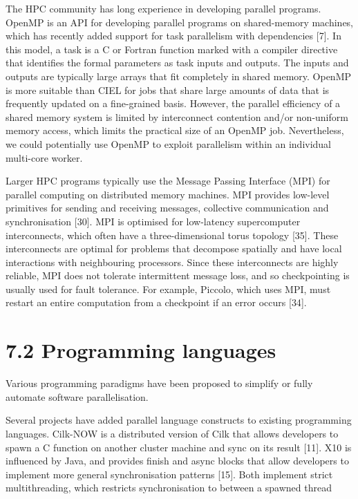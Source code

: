 \documentclass[
]{article}
\begin{document}
The HPC community has long experience in developing parallel programs.
OpenMP is an API for developing parallel programs on shared-memory
machines, which has recently added support for task parallelism with
dependencies {[}7{]}. In this model, a task is a C or Fortran function
marked with a compiler directive that identifies the formal parameters
as task inputs and outputs. The inputs and outputs are typically large
arrays that fit completely in shared memory. OpenMP is more suitable
than CIEL for jobs that share large amounts of data that is frequently
updated on a fine-grained basis. However, the parallel efficiency of a
shared memory system is limited by interconnect contention and/or
non-uniform memory access, which limits the practical size of an OpenMP
job. Nevertheless, we could potentially use OpenMP to exploit
parallelism within an individual multi-core worker.

Larger HPC programs typically use the Message Passing Interface (MPI)
for parallel computing on distributed memory machines. MPI provides
low-level primitives for sending and receiving messages, collective
communication and synchronisation {[}30{]}. MPI is optimised for
low-latency supercomputer interconnects, which often have a
three-dimensional torus topology {[}35{]}. These interconnects are
optimal for problems that decompose spatially and have local
interactions with neighbouring processors. Since these interconnects are
highly reliable, MPI does not tolerate intermittent message loss, and so
checkpointing is usually used for fault tolerance. For example, Piccolo,
which uses MPI, must restart an entire computation from a checkpoint if
an error occurs {[}34{]}.

\section{7.2 Programming languages}\label{programming-languages}

Various programming paradigms have been proposed to simplify or fully
automate software parallelisation.

Several projects have added parallel language constructs to existing
programming languages. Cilk-NOW is a distributed version of Cilk that
allows developers to spawn a C function on another cluster machine and
sync on its result {[}11{]}. X10 is influenced by Java, and provides
finish and async blocks that allow developers to implement more general
synchronisation patterns {[}15{]}. Both implement strict multithreading,
which restricts synchronisation to between a spawned thread
\end{document}
